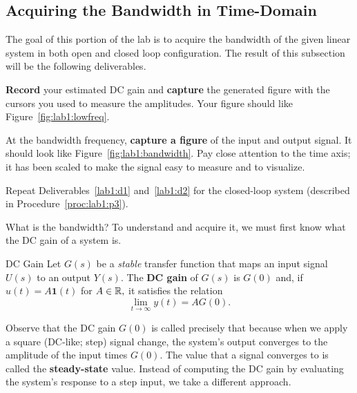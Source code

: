 \subsection{Acquiring the Bandwidth in Time-Domain}
The goal of this portion of the lab is to acquire the bandwidth of the
given linear system in both open and closed loop configuration.
The result of this subsection will be the following deliverables.
%
\begin{deliverable}[label={lab1:d1}]
  \textbf{Record} your estimated DC gain and \textbf{capture} the generated
  figure with the cursors you used to measure the amplitudes.
  Your figure should like Figure~\ref{fig:lab1:lowfreq}.
\end{deliverable}
%
\begin{deliverable}[label={lab1:d2}]
  At the bandwidth frequency,
  \textbf{capture a figure} of the input and output signal. It should look
  like Figure~\ref{fig:lab1:bandwidth}. Pay close attention to the time
  axis; it has been scaled to make the signal easy to measure and to visualize.
\end{deliverable}
%
\begin{deliverable}[label={lab1:d3}]
  Repeat Deliverables~\ref{lab1:d1} and~\ref{lab1:d2} for the closed-loop
  system (described in Procedure~\ref{proc:lab1:p3}).
\end{deliverable}
%
What is the bandwidth? To understand and acquire it,
we must first know what the DC gain of a system is.
%
\begin{definition}[label={def:lab1:dcgain}]{DC Gain}
  Let \(G(s)\) be a \emph{stable} transfer function
  that maps an input signal \(U(s)\) to an
  output \(Y(s).\) The \textbf{DC gain} of \(G(s)\) is \(G(0)\) and,
  if \(u(t) = A \mathbf{1}(t)\) for \(A \in \mathbb{R},\) it satisfies the relation
  \[
    \lim_{t\to \infty} y(t) = A G(0).
  \]
\end{definition}
%
Observe that the DC gain \(G(0)\) is called precisely that because when we
apply a square (DC-like; step) signal change, the system's output converges
to the amplitude of the input times \(G(0).\)
The value that a signal converges to is called the \textbf{steady-state} value.
%
Instead of computing the DC gain by evaluating the system's response to a step
input, we take a different approach.
%
